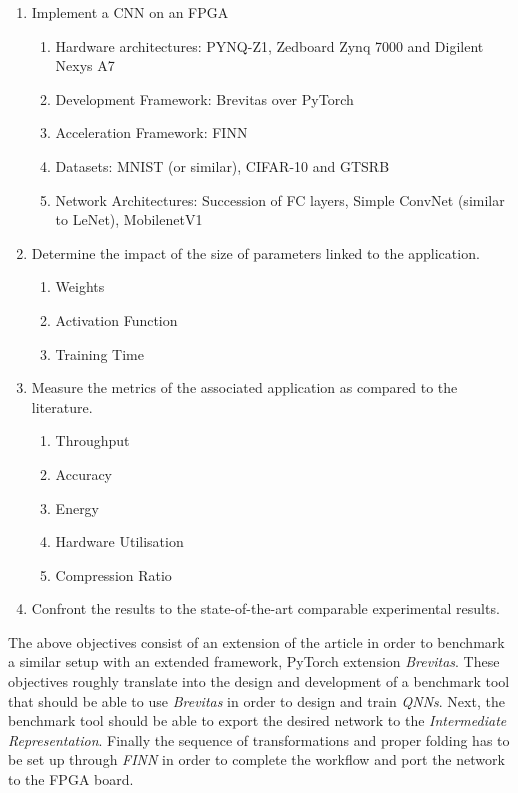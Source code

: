 \begin{enumerate}
  \item Implement a CNN on an FPGA
  \begin{enumerate}
    \item Hardware architectures: PYNQ-Z1, Zedboard Zynq 7000 and Digilent Nexys A7
    \item Development Framework: Brevitas over PyTorch
    \item Acceleration Framework: FINN
    \item Datasets: MNIST (or similar), CIFAR-10 and GTSRB
    \item Network Architectures: Succession of FC layers, Simple ConvNet (similar to LeNet), MobilenetV1
  \end{enumerate}
  \item Determine the impact of the size of parameters linked to the application.
  \begin{enumerate}
    \item Weights
    \item Activation Function
    \item Training Time
  \end{enumerate}
  \item Measure the metrics of the associated application as compared to the literature.
  \begin{enumerate}
    \item Throughput
    \item Accuracy
    \item Energy
    \item Hardware Utilisation
    \item Compression Ratio
  \end{enumerate}
  \item Confront the results to the state-of-the-art comparable experimental results.
\end{enumerate}

The above objectives consist of an extension of the \cite{Bacchus2020} article in order to benchmark a similar setup with an extended framework, PyTorch extension \emph{Brevitas}. These objectives roughly translate into the design and development of a benchmark tool that should be able to use \emph{Brevitas} in order to design and train \emph{QNNs}. Next, the benchmark tool should be able to export the desired network to the \emph{Intermediate Representation}. Finally the sequence of transformations and proper folding has to be set up through \emph{FINN} in order to complete the workflow and port the network to the FPGA board.


